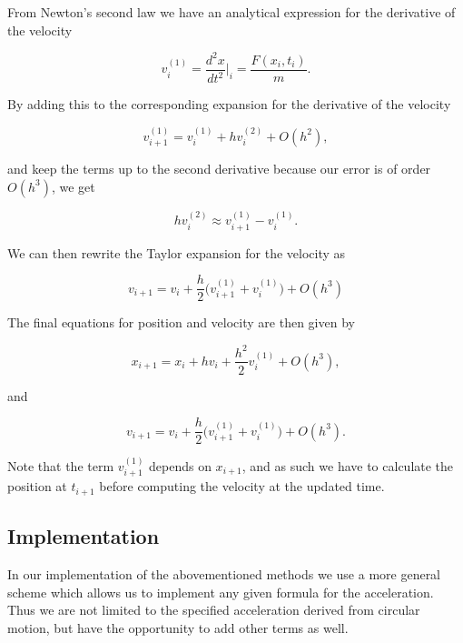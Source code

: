 \documentclass[a4paper, fontsize=11pt]{article}
\begin{document}
From Newton's second law we have an analytical expression for the derivative of the velocity

\begin{equation}
v_{i}^{(1)}=\dfrac{d^2x}{dt^2}\rvert_{i} = \dfrac{F(x_{i}, t_{i})}{m}.
\end{equation}

By adding this to the corresponding expansion for the derivative of the velocity 

\begin{equation}
v_{i+1}^{(1)} = v_{i}^{(1)} + h v_{i}^{(2)} + O(h^2),
\end{equation}

and keep the terms up to the second derivative because our error is of order $O(h^3)$, we get

\begin{equation}
h v_{i}^{(2)} \approx v_{i+1}^{(1)} - v_{i}^{(1)}.
\end{equation}

We can then rewrite the Taylor expansion for the velocity as 

\begin{equation}
v_{i+1} = v_{i} + \dfrac{h}{2}\Big( v_{i+1}^{(1)} + v_{i}^{(1)} \Big) + O(h^3)
\end{equation}

The final equations for position and velocity are then given by

\begin{equation}
x_{i+1} = x_{i} + h v_{i} + \dfrac{h^2}{2} v_{i}^{(1)} + O(h^3),
\end{equation}

and 

\begin{equation}
v_{i+1} = v_{i} + \dfrac{h}{2} \Big( v_{i+1}^{(1)} +v_{i}^{(1)} \Big) + O(h^3).
\end{equation}

Note that the term $v_{i+1}^{(1)}$ depends on $x_{i+1}$, and as such we have to calculate the position at $t_{i+1}$ before computing the velocity at the updated time. \cite{ODE}



\subsection{Implementation}

In our implementation of the abovementioned methods we use a more general scheme which allows us to implement any given formula for the acceleration. Thus we are not limited to the specified acceleration derived from circular motion, but have the opportunity to add other terms as well. 
\end{document}
